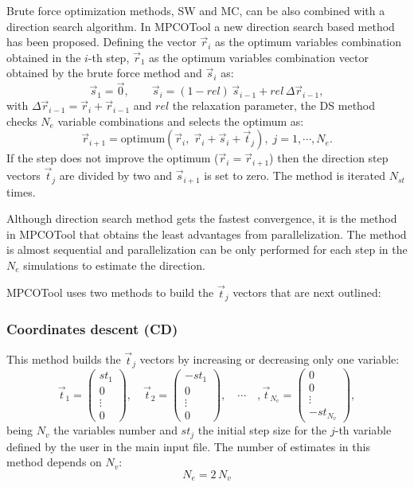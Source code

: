 \documentclass[review,authoryear]{elsarticle}
\newcommand{\EQ}[2]
{\begin{equation}#1\label{#2}\end{equation}}
\newcommand{\MATRIX}[2]{\PA{\begin{array}{#1}#2\end{array}}}
\newcommand{\PA}[1]{\left(#1\right)}
\begin{document}
Brute force optimization methods, SW and MC, can be also combined
with a direction search algorithm. In MPCOTool a new direction search based
method has been proposed. Defining the vector $\vec{r}_i$ as the optimum
variables combination obtained in the $i$-th step, $\vec{r}_1$ as the optimum
variables combination vector obtained by the brute force method and $\vec{s}_i$ as:
\EQ
{
	\vec{s}_1=\vec{0},\qquad
	\vec{s}_i=(1-rel)\,\vec{s}_{i-1}+rel\,\Delta\vec{r}_{i-1},
}{Eqs}
with $\Delta\vec{r}_{i-1}=\vec{r}_i+\vec{r}_{i-1}$ and $rel$ the
relaxation parameter, the DS method checks $N_e$
variable combinations and selects the optimum as:
\EQ
{
	\vec{r}_{i+1}
	=\mathrm{optimum}\PA{\vec{r}_i,\;\vec{r}_i+\vec{s}_i+\vec{t}_j},
	\;j=1,\cdots,N_e.
}{EqDirection}
If the step does not improve the optimum ($\vec{r}_i=\vec{r}_{i+1}$) then the
direction step vectors $\vec{t}_j$ are divided by two and $\vec{s}_{i+1}$ is set
to zero. The method is iterated $N_{st}$ times.

Although direction search method gets the fastest convergence, it is the method
in MPCOTool that obtains the least advantages from parallelization. The method is
almost sequential and parallelization can be only performed for each step in the
$N_e$ simulations to estimate the direction.

MPCOTool uses two methods to build the $\vec{t}_j$ vectors that are next outlined:

\subsubsection{Coordinates descent (CD)}

This method builds the $\vec{t}_j$ vectors by increasing or decreasing only one
variable:
\EQ
{
	\vec{t}_1=\MATRIX{c}{st_1\\0\\\vdots\\0},\quad
	\vec{t}_2=\MATRIX{c}{-st_1\\0\\\vdots\\0},\quad
	\cdots\quad,\vec{t}_{N_e}=\MATRIX{c}{0\\0\\\vdots\\-st_{N_v}},
}{EqtDescent}
being $N_v$ the variables number and $st_j$ the initial step size for the $j$-th
variable defined by the user in the main input file. The number of estimates in
this method depends on $N_v$:
\EQ{N_e=2\,N_v}{EqNestimatesDescent}
\end{document}
